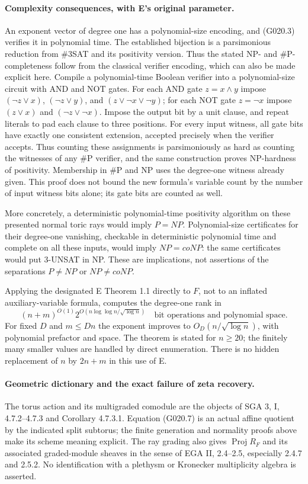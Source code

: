 \paragraph{Complexity consequences, with E's original parameter.}
An exponent vector of degree one has a polynomial-size encoding,
and (G020.3) verifies it in polynomial time. The established
bijection is a parsimonious reduction from \#3SAT and its
positivity version. Thus the stated NP- and \#P-completeness follow
from the classical verifier encoding, which can also be made
explicit here. Compile a polynomial-time Boolean verifier into a
polynomial-size circuit with AND and NOT gates. For each AND gate
$z=x\wedge y$ impose
$(\neg z\vee x)$, $(\neg z\vee y)$, and
$(z\vee\neg x\vee\neg y)$; for each NOT gate $z=\neg x$ impose
$(z\vee x)$ and $(\neg z\vee\neg x)$. Impose the output bit by
a unit clause, and repeat literals to pad each clause to three
positions. For every input witness, all gate bits have exactly
one consistent extension, accepted precisely when the verifier
accepts. Thus counting these assignments is parsimoniously as
hard as counting the witnesses of any \#P verifier, and the same
construction proves NP-hardness of positivity. Membership in
\#P and NP uses the degree-one witness already given. This proof
does not bound the new formula's variable count by the number
of input witness bits alone; its gate bits are counted as well.

More concretely, a deterministic polynomial-time positivity algorithm
on these presented normal toric rays would imply $P=NP$.
Polynomial-size certificates for their degree-one vanishing,
checkable in deterministic polynomial time and complete on all
these inputs, would imply $NP=coNP$: the same certificates would
put $3$-UNSAT in NP. These are implications, not assertions of
the separations $P\ne NP$ or $NP\ne coNP$.

Applying the designated E Theorem 1.1 directly to $F$, not to an
inflated auxiliary-variable formula, computes the degree-one
rank in
\[
 (n+m)^{O(1)}2^{O(n\log\log n/\sqrt{\log n})}
 \quad\text{bit operations and polynomial space}.
 \tag{G020.8}
\]
For fixed $D$ and $m\leq Dn$ the exponent improves to
$O_D(n/\sqrt{\log n})$, with polynomial prefactor and space.
The theorem is stated for $n\geq20$; the finitely many smaller
values are handled by direct enumeration. There is no hidden
replacement of $n$ by $2n+m$ in this use of E.

\paragraph{Geometric dictionary and the exact failure of zeta recovery.}
The torus action and its multigraded comodule are the objects of
SGA 3, I, 4.7.2--4.7.3 and Corollary 4.7.3.1. Equation (G020.7)
is an actual affine quotient by the indicated split subtorus;
the finite generation and normality proofs above make its scheme
meaning explicit. The ray grading also gives $\operatorname{Proj}R_F$
and its associated graded-module sheaves in the sense of EGA II,
2.4--2.5, especially 2.4.7 and 2.5.2. No identification with a
plethysm or Kronecker multiplicity algebra is asserted.

